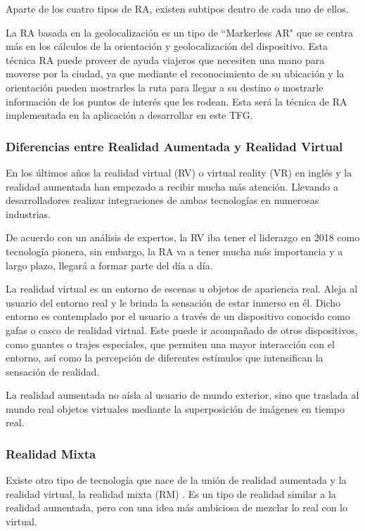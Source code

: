 Aparte de los cuatro tipos de RA, existen subtipos dentro de cada uno de ellos.

La RA basada en la geolocalización es un tipo de ``Markerless AR"  que se centra más en los cálculos de la orientación y geolocalización del dispositivo. Esta técnica RA puede proveer de ayuda viajeros que necesiten una mano para moverse por la ciudad, ya que mediante el reconocimiento de su ubicación y la orientación pueden mostrarles la ruta para llegar a su destino o mostrarle información de los puntos de interés que les rodean. Esta será la técnica de RA implementada en la aplicación a desarrollar en este TFG. 


\subsubsection{Diferencias entre Realidad Aumentada y Realidad Virtual}
En los últimos años la realidad virtual (RV) \cite{URL::VR} o virtual reality (VR) en inglés y la realidad aumentada han empezado a recibir mucha más atención. Llevando a desarrolladores realizar integraciones de ambas tecnologías en numerosas industrias.

De acuerdo con un análisis de expertos, la RV iba tener el liderazgo en 2018 como tecnología pionera, sin embargo, la RA va a tener mucha más importancia y a largo plazo, llegará a formar parte del día a día.

La realidad virtual es un entorno de escenas u objetos de apariencia real. Aleja al usuario del entorno real y le brinda la sensación de estar inmerso en él. Dicho entorno es contemplado por el usuario a través de un dispositivo conocido como gafas o casco de realidad virtual. Este puede ir acompañado de otros dispositivos, como guantes o trajes especiales, que permiten una mayor interacción con el entorno, así como la percepción de diferentes estímulos que intensifican la sensación de realidad.

La realidad aumentada no aísla al usuario de mundo exterior, sino que traslada al mundo real objetos virtuales mediante la superposición de imágenes en tiempo real. 

\subsubsection{Realidad Mixta}

Existe otro tipo de tecnología que nace de la unión de realidad aumentada y la realidad virtual, la realidad mixta (RM) \cite{URL::RM}. Es un tipo de realidad similar a la realidad aumentada, pero con una idea más ambiciosa de mezclar lo real con lo virtual.

